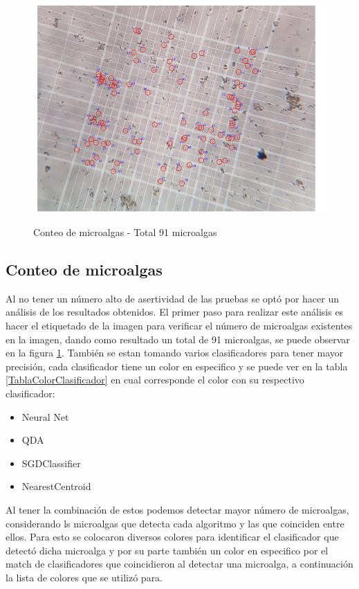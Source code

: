\documentclass[conference]{IEEEtran}
\begin{document}
\begin{figure}[h]
\centering
{\includegraphics[width=.90\linewidth]{img/CONTEOMICROALGAS.png}}
\caption{Conteo de microalgas - Total 91 microalgas }
\label{fig:4}
\end{figure}

\subsection{Conteo de microalgas}

Al no  tener un número alto de asertividad de las pruebas se optó por hacer un análisis de los resultados obtenidos. El primer paso para realizar este análisis es hacer el etiquetado de la imagen para verificar el número de microalgas existentes en la imagen, dando como resultado un total de 91 microalgas, se puede observar en la figura \ref{fig:4}. También se estan tomando varios clasificadores para tener mayor precisión, cada clasificador tiene un color en especifico y se puede ver en la tabla \ref{TablaColorClasificador} en cual corresponde el color con su respectivo clasificador:
\begin{itemize}
    \item Neural Net
    \item  QDA
    \item SGDClassifier
    \item NearestCentroid
\end{itemize}
Al tener la combinación de estos podemos detectar mayor número de microalgas, considerando ls microalgas que detecta cada algoritmo y las que coinciden entre ellos. Para esto se colocaron diversos colores para identificar el clasificador que detectó dicha microalga y por su parte también un color en especifico por el match de clasificadores que coincidieron al detectar una microalga, a continuación la lista de colores que se utilizó para.
\end{document}

